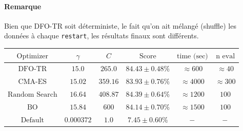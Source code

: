 \documentclass[12 pt, a4paper]{article}
\begin{document}
\paragraph*{Remarque} Bien que DFO-TR soit déterministe, le fait qu'on ait mélangé (shuffle) les données à chaque \texttt{restart}, les résultats finaux sont différents.

\begin{center}
\begin{tabular}{|c|c|c|c|c|c|}
  \hline
  $\text{Optimizer}$ & $\gamma$ & $C$ & $\text{Score}$ & $\text{time (sec)}$ & $\text{n eval}$ \\
  \hline
  $\text{DFO-TR}$ & $15.0$ & $265.0$ & $84.43 \pm 0.48 \%$ & $\approx 600$ & $\approx 40$ \\
  $\text{CMA-ES}$ & $15.02$ & $359.16$ & $83.93 \pm 0.76 \%$ & $\approx 4000$ & $\approx 300$\\
  $\text{Random Search}$ & $16.64$ & $408.87$ & $84.39 \pm 0.64 \%$ & $\approx 1200$ & $100$\\
  $\text{BO}$ & $15.84$ & $600$ & $84.14 \pm 0.70 \%$ & $\approx 1500$ & $100$\\
  $\text{Default}$ & $0.000372$ & $1.0$ & $7.45 \pm 0.60 \%$ & $\--$ & $\--$\\
  \hline
\end{tabular}
\end{center}
\end{document}
